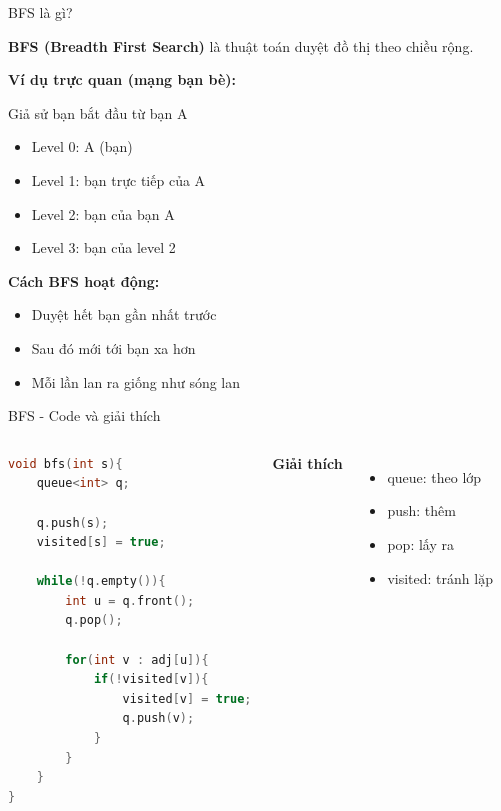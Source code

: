 \documentclass{beamer}
\newcommand{\hlblue}[1]{\textcolor{myblue}{#1}}
\newcommand{\hlgreen}[1]{\textcolor{mygreen}{#1}}
\newcommand{\hlred}[1]{\textcolor{myred}{#1}}
\newcommand{\hlpurple}[1]{\textcolor{mypurple}{#1}}
\newcommand{\hlorange}[1]{\textcolor{myorange}{#1}}
\begin{document}
\begin{frame}{BFS là gì?}

\textbf{BFS (Breadth First Search)} là thuật toán duyệt đồ thị theo \hlblue{chiều rộng}.

\vspace{6pt}

\textbf{Ví dụ trực quan (mạng bạn bè):}

Giả sử bạn bắt đầu từ \hlred{bạn A}

\begin{itemize}
\item Level 0: A (bạn)
\item Level 1: bạn trực tiếp của A
\item Level 2: bạn của bạn A
\item Level 3: bạn của level 2
\end{itemize}

\vspace{6pt}

\textbf{Cách BFS hoạt động:}
\begin{itemize}
\item Duyệt hết \hlgreen{bạn gần nhất} trước
\item Sau đó mới tới \hlorange{bạn xa hơn}
\item Mỗi lần lan ra giống như \hlblue{sóng lan}
\end{itemize}

\end{frame}

\begin{frame}[fragile]{BFS - Code và giải thích}

\begin{columns}

\begin{tcolorbox}
\begin{lstlisting}[language=C++]
void bfs(int s){
    queue<int> q;

    q.push(s);
    visited[s] = true;

    while(!q.empty()){
        int u = q.front();
        q.pop();

        for(int v : adj[u]){
            if(!visited[v]){
                visited[v] = true;
                q.push(v);
            }
        }
    }
}
\end{lstlisting}
\end{tcolorbox}


\textbf{Giải thích}

\begin{itemize}
\item \hlblue{queue}: theo lớp
\item \hlgreen{push}: thêm
\item \hlred{pop}: lấy ra
\item \hlpurple{visited}: tránh lặp
\end{itemize}

\end{columns}

\end{frame}
\end{document}

